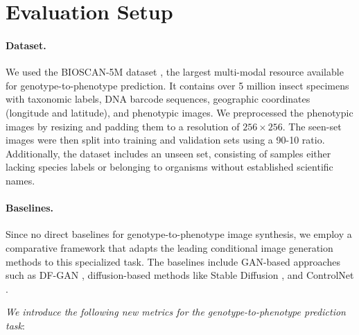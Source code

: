 \vspace{-3mm}
\section{Evaluation Setup}

\paragraph{Dataset.}
We used the BIOSCAN-5M dataset \cite{gharaee2024bioscan5m}, the largest multi-modal resource available for genotype-to-phenotype prediction.
It contains over 5 million insect specimens with taxonomic labels, DNA barcode sequences, geographic coordinates (longitude and latitude), and phenotypic images. We preprocessed the phenotypic images by resizing and padding them to a resolution of 
$256 \times 256$. The seen-set images were then split into training and validation sets using a 90-10 ratio. Additionally, the dataset includes an unseen set, consisting of samples either lacking species labels or belonging to organisms without established scientific names.



\vspace{-3mm}
\paragraph{Baselines.}
Since no direct baselines for genotype-to-phenotype image synthesis, we employ a comparative framework that adapts the leading conditional image generation methods to this specialized task. The baselines include GAN-based approaches such as DF-GAN \cite{liao2022text},  diffusion-based methods like Stable Diffusion \cite{rombach2022high}, and ControlNet \cite{zhang2023adding}.


\vspace{2mm}
\textit{We introduce the following new metrics for the genotype-to-phenotype prediction task}:
\vspace{-3mm}

